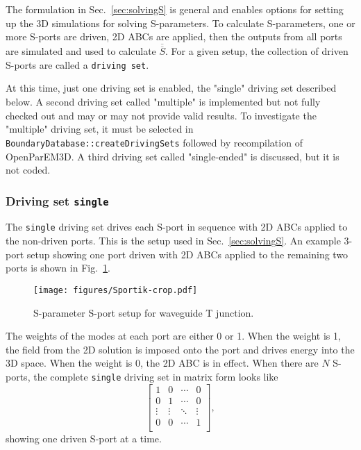 \documentclass[titlepage]{article}
\renewcommand\_{\textunderscore\linebreak[1]}
\begin{document}
The formulation in Sec.~\ref{sec:solvingS} is general and enables options for setting up the 3D simulations for solving S-parameters.  To calculate S-parameters, one or more S-ports are driven, 2D ABCs are applied, then the outputs from all ports are simulated and used to calculate $\overline{\overline{S}}$.  For a given setup, the collection of driven S-ports are called a \texttt{driving set}.

At this time, just one driving set is enabled, the "single" driving set described below.  A second driving set called "multiple" is implemented but not fully checked out and may or may not provide valid results.  To investigate the "multiple" driving set, it must be selected in \texttt{BoundaryDatabase::createDrivingSets} followed by recompilation of OpenParEM3D.  A third driving set called "single-ended" is discussed, but it is not coded.

\subsubsection{Driving set \texttt{single}}

The \texttt{single} driving set drives each S-port in sequence with 2D ABCs applied to the non-driven ports.  This is the setup used in Sec.~\ref{sec:solvingS}.  An example 3-port setup showing one port driven with 2D ABCs applied to the remaining two ports is shown in Fig.~\ref{fig:Sportik}.

\begin{figure}
  \centering
  \texttt{[image: figures/Sportik-crop.pdf]}
  \caption{S-parameter S-port setup for waveguide T junction.}
  \label{fig:Sportik}
\end{figure}

The weights of the modes at each port are either 0 or 1.  When the weight is 1, the field from the 2D solution is imposed onto the port and drives energy into the 3D space.  When the weight is 0, the 2D ABC is in effect.  When there are $N$ S-ports, the complete \texttt{single} driving set in matrix form looks like
\begin{equation}
\left[ \begin{array}{cccc}
  1 & 0 & \cdots & 0 \\
  0 & 1 & \cdots & 0 \\
  \vdots & \vdots & \ddots & \vdots \\
  0 & 0 & \cdots & 1 \\
\end{array} \right],
\end{equation}
showing one driven S-port at a time.
\end{document}
